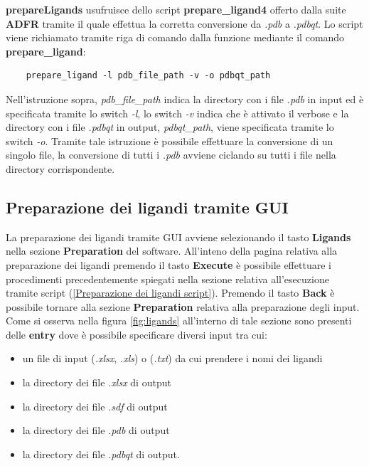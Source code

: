 \textbf{prepareLigands} usufruisce dello script \textbf{prepare\_ligand4} offerto dalla suite \textbf{ADFR} tramite il quale effettua la corretta conversione da \textit{.pdb} a \textit{.pdbqt}. Lo script viene richiamato tramite riga di comando dalla funzione mediante il comando \textbf{prepare\_ligand}:

\begin{verbatim}
    prepare_ligand -l pdb_file_path -v -o pdbqt_path
\end{verbatim}

Nell'istruzione sopra, \textit{pdb\_file\_path} indica la directory con i file \textit{.pdb} in input ed è specificata tramite lo switch \textit{-l}, lo switch \textit{-v} indica che è attivato il verbose e la directory con i file \textit{.pdbqt} in output, \textit{pdbqt\_path}, viene specificata tramite lo switch \textit{-o}. Tramite tale istruzione è possibile effettuare la conversione di un singolo file, la conversione di tutti i \textit{.pdb} avviene ciclando su tutti i file nella directory corrispondente.

\subsection{Preparazione dei ligandi tramite GUI}
La preparazione dei ligandi tramite GUI avviene selezionando il tasto \textbf{Ligands} nella sezione \textbf{Preparation} del software. All'inteno della pagina relativa alla preparazione dei ligandi premendo il tasto \textbf{Execute} è possibile effettuare i procedimenti precedentemente spiegati nella sezione relativa all'esecuzione tramite script (\ref{Preparazione dei ligandi script}). Premendo il tasto \textbf{Back} è possibile tornare alla sezione \textbf{Preparation} relativa alla preparazione degli input.
Come si osserva nella figura \ref{fig:ligands} all'interno di tale sezione sono presenti delle \textbf{entry} dove è possibile specificare diversi input tra cui:

\begin{itemize}
    \item un file di input (\textit{.xlsx}, \textit{.xls}) o (\textit{.txt}) da cui prendere i nomi dei ligandi
    \item la directory dei file \textit{.xlsx} di output
    \item la directory dei file \textit{.sdf} di output
    \item la directory dei file \textit{.pdb} di output
    \item la directory dei file \textit{.pdbqt} di output.
\end{itemize}

